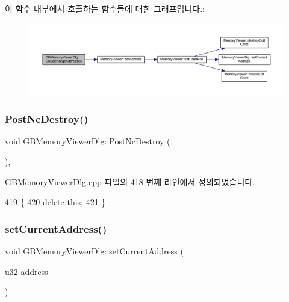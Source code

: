 이 함수 내부에서 호출하는 함수들에 대한 그래프입니다.\+:
\nopagebreak
\begin{figure}[H]
\begin{center}
\leavevmode
\includegraphics[width=350pt]{class_g_b_memory_viewer_dlg_a4e089b7216a76ba514f26f061f53fd8c_cgraph}
\end{center}
\end{figure}
\mbox{\label{class_g_b_memory_viewer_dlg_a5c0847f6b059bc27ccf18ae85ebe249a}} 
\subsubsection{\texorpdfstring{Post\+Nc\+Destroy()}{PostNcDestroy()}}
{\footnotesize\ttfamily void G\+B\+Memory\+Viewer\+Dlg\+::\+Post\+Nc\+Destroy (\begin{DoxyParamCaption}{ }\end{DoxyParamCaption})\hspace{0.3cm}{\ttfamily [protected]}, {\ttfamily [virtual]}}



G\+B\+Memory\+Viewer\+Dlg.\+cpp 파일의 418 번째 라인에서 정의되었습니다.


\begin{DoxyCode}
419 \{
420   \textcolor{keyword}{delete} \textcolor{keyword}{this};
421 \}
\end{DoxyCode}
\mbox{\label{class_g_b_memory_viewer_dlg_a9d6e6bf119f77c2b8843800ae5a6df7b}} 
\subsubsection{\texorpdfstring{set\+Current\+Address()}{setCurrentAddress()}}
{\footnotesize\ttfamily void G\+B\+Memory\+Viewer\+Dlg\+::set\+Current\+Address (\begin{DoxyParamCaption}\item[{\mbox{\hyperlink{_system_8h_a10e94b422ef0c20dcdec20d31a1f5049}{u32}}}]{address }\end{DoxyParamCaption})\hspace{0.3cm}{\ttfamily [virtual]}}




